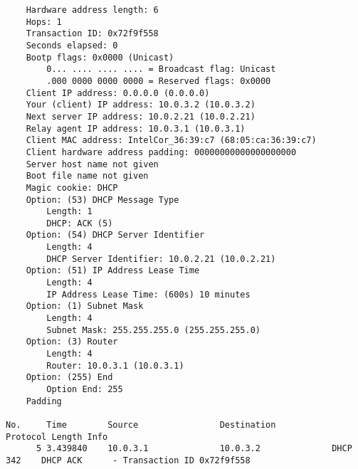 \begin{lstlisting}
    Hardware address length: 6
    Hops: 1
    Transaction ID: 0x72f9f558
    Seconds elapsed: 0
    Bootp flags: 0x0000 (Unicast)
        0... .... .... .... = Broadcast flag: Unicast
        .000 0000 0000 0000 = Reserved flags: 0x0000
    Client IP address: 0.0.0.0 (0.0.0.0)
    Your (client) IP address: 10.0.3.2 (10.0.3.2)
    Next server IP address: 10.0.2.21 (10.0.2.21)
    Relay agent IP address: 10.0.3.1 (10.0.3.1)
    Client MAC address: IntelCor_36:39:c7 (68:05:ca:36:39:c7)
    Client hardware address padding: 00000000000000000000
    Server host name not given
    Boot file name not given
    Magic cookie: DHCP
    Option: (53) DHCP Message Type
        Length: 1
        DHCP: ACK (5)
    Option: (54) DHCP Server Identifier
        Length: 4
        DHCP Server Identifier: 10.0.2.21 (10.0.2.21)
    Option: (51) IP Address Lease Time
        Length: 4
        IP Address Lease Time: (600s) 10 minutes
    Option: (1) Subnet Mask
        Length: 4
        Subnet Mask: 255.255.255.0 (255.255.255.0)
    Option: (3) Router
        Length: 4
        Router: 10.0.3.1 (10.0.3.1)
    Option: (255) End
        Option End: 255
    Padding

No.     Time        Source                Destination           Protocol Length Info
      5 3.439840    10.0.3.1              10.0.3.2              DHCP     342    DHCP ACK      - Transaction ID 0x72f9f558


\end{lstlisting}
